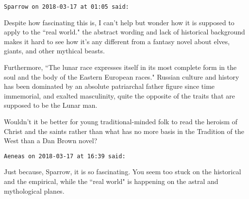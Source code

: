 \begin{footnotesize}
\begin{sffamily}
\hfill

\texttt{Sparrow on 2018-03-17 at 01:05 said: }

Despite how fascinating this is, I can't help but wonder how it is supposed to apply to the ``real world." the abstract wording and lack of historical background makes it hard to see how it's any different from a fantasy novel about elves, giants, and other mythical beasts.

Furthermore, ``The lunar race expresses itself in its most complete form in the soul and the body of the Eastern European races." Russian culture and history has been dominated by an absolute patriarchal father figure since time immemorial, and exalted masculinity, quite the opposite of the traits that are supposed to be the Lunar man.

Wouldn't it be better for young traditional-minded folk to read the heroism of Christ and the saints rather than what has no more basis in the Tradition of the West than a Dan Brown novel?


\hfill

\texttt{Aeneas on 2018-03-17 at 16:39 said: }

Just because, Sparrow, it is so fascinating. You seem too stuck on the historical and the empirical, while the ``real world" is happening on the astral and mythological planes.


\end{sffamily}\end{footnotesize}
